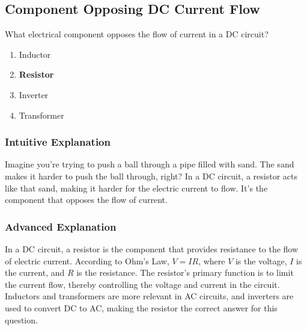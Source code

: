 \subsection{Component Opposing DC Current Flow}
\label{T6A01}

\begin{tcolorbox}[colback=gray!10!white,colframe=black!75!black,title=T6A01]
What electrical component opposes the flow of current in a DC circuit?
\begin{enumerate}[noitemsep]
    \item Inductor
    \item \textbf{Resistor}
    \item Inverter
    \item Transformer
\end{enumerate}
\end{tcolorbox}

\subsubsection*{Intuitive Explanation}
Imagine you're trying to push a ball through a pipe filled with sand. The sand makes it harder to push the ball through, right? In a DC circuit, a resistor acts like that sand, making it harder for the electric current to flow. It's the component that opposes the flow of current.

\subsubsection*{Advanced Explanation}
In a DC circuit, a resistor is the component that provides resistance to the flow of electric current. According to Ohm's Law, \( V = IR \), where \( V \) is the voltage, \( I \) is the current, and \( R \) is the resistance. The resistor's primary function is to limit the current flow, thereby controlling the voltage and current in the circuit. Inductors and transformers are more relevant in AC circuits, and inverters are used to convert DC to AC, making the resistor the correct answer for this question.